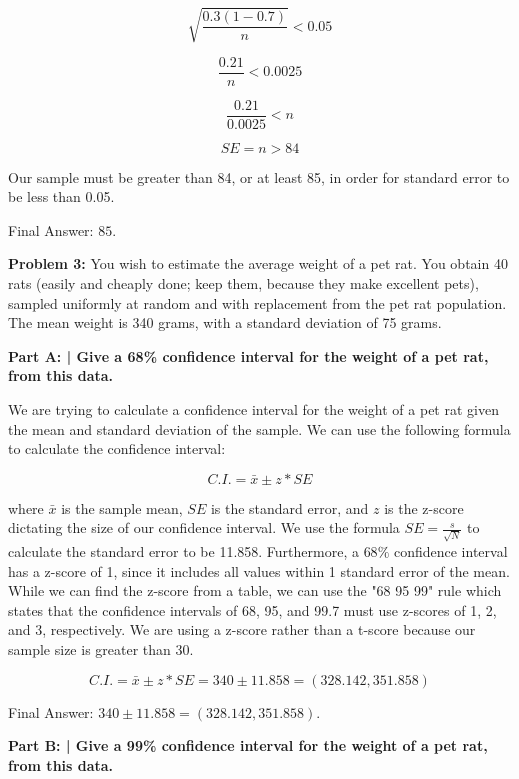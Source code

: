 \documentclass{article}
\begin{document}
 \[\sqrt{\frac{0.3(1-0.7)}{n}} < 0.05\]
 
 \[\frac{0.21}{n} < 0.0025\]
 
 \[\frac{0.21}{0.0025} < n\]
 
 \[SE = n > 84 \]
 
 Our sample must be greater than 84, or at least 85, in order for standard error to be less than 0.05.
 
 Final Answer: $85$.\newline
 
 \newpage

 \begin{center}
      \Large\textbf{Problem 3:} You wish to estimate the average weight of a pet rat. You obtain 40 rats (easily and cheaply done; keep them, because they make excellent pets), sampled uniformly at random and with replacement from the pet rat population. The mean weight is 340 grams, with a standard deviation of 75 grams.\par
 \end{center}

 \textbf{Part A: | Give a 68\% confidence interval for the weight of a pet rat, from this data.}\newline
 
 We are trying to calculate a confidence interval for the weight of a pet rat given the mean and standard deviation of the sample. We can use the following formula to calculate the confidence interval:
 
 \[C.I. = \bar{x} \pm z*SE\]
 
 where $\bar{x}$ is the sample mean, $SE$ is the standard error, and $z$ is the z-score dictating the size of our confidence interval. We use the formula $SE = \frac{s}{\sqrt{N}}$ to calculate the standard error to be 11.858. Furthermore, a $68\%$ confidence interval has a z-score of 1, since it includes all values within 1 standard error of the mean. While we can find the z-score from a table, we can use the "68 95 99" rule which states that the confidence intervals of 68, 95, and 99.7 must use z-scores of 1, 2, and 3, respectively. We are using a z-score rather than a t-score because our sample size is greater than 30.
 
 \[C.I. = \bar{x} \pm z*SE = 340 \pm 11.858 = (328.142, 351.858)\]
 
 Final Answer: $340 \pm 11.858 = (328.142, 351.858)$.\newline
 
 \textbf{Part B: | Give a 99\% confidence interval for the weight of a pet rat, from this data.}\newline
 
\end{document}

